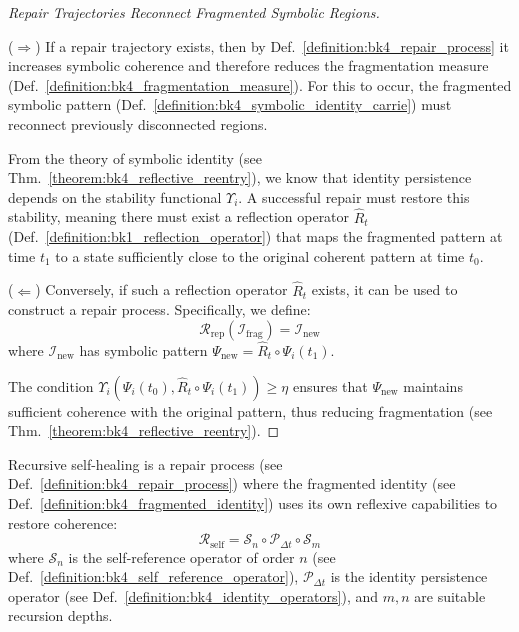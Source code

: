 \begin{proof}[Repair Trajectories Reconnect Fragmented Symbolic Regions]
\label{proof:bk4_repair_reconnects_fragmentation}
\leavevmode

($\Rightarrow$) If a repair trajectory exists, then by
Def.~\ref{definition:bk4_repair_process} it increases symbolic coherence and
therefore reduces the fragmentation measure
(Def.~\ref{definition:bk4_fragmentation_measure}).
For this to occur, the fragmented symbolic pattern
(Def.~\ref{definition:bk4_symbolic_identity_carrie}) must reconnect previously
disconnected regions.

From the theory of symbolic identity (see Thm.~\ref{theorem:bk4_reflective_reentry}), we know that identity persistence depends on the stability functional $\Upsilon_i$. A successful repair must restore this stability, meaning there must exist a reflection operator $\widehat{R}_t$ (Def.~\ref{definition:bk1_reflection_operator}) that maps the fragmented pattern at time $t_1$ to a state sufficiently close to the original coherent pattern at time $t_0$.

($\Leftarrow$) Conversely, if such a reflection operator $\widehat{R}_t$ exists, it can be used to construct a repair process. Specifically, we define:
\begin{equation}
    \mathcal{R}_{\text{rep}}(\mathcal{I}_{\text{frag}}) = \mathcal{I}_{\text{new}}
\end{equation}
where $\mathcal{I}_{\text{new}}$ has symbolic pattern $\Psi_{\text{new}} = \widehat{R}_t \circ \Psi_i(t_1)$.

The condition $\Upsilon_i(\Psi_i(t_0), \widehat{R}_t \circ \Psi_i(t_1)) \geq \eta$ ensures that $\Psi_{\text{new}}$ maintains sufficient coherence with the original pattern, thus reducing fragmentation (see Thm.~\ref{theorem:bk4_reflective_reentry}).
\end{proof}
\begin{definition} \label{definition:bk4_recursive_self_healing}
Recursive self-healing is a repair process (see Def.~\ref{definition:bk4_repair_process}) where the fragmented identity (see Def.~\ref{definition:bk4_fragmented_identity}) uses its own reflexive capabilities to restore coherence:
\begin{equation}
    \mathcal{R}_{\text{self}} = \mathcal{S}_n \circ \mathcal{P}_{\Delta t} \circ \mathcal{S}_m
\end{equation}
where $\mathcal{S}_n$ is the self-reference operator of order $n$ (see Def.~\ref{definition:bk4_self_reference_operator}), $\mathcal{P}_{\Delta t}$ is the identity persistence operator (see Def.~\ref{definition:bk4_identity_operators}), and $m, n$ are suitable recursion depths.
\end{definition}

